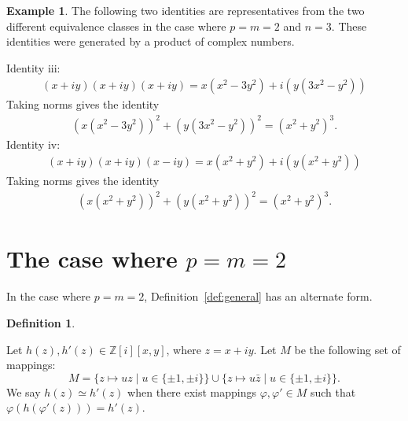 \documentclass[12pt]{article}
\theoremstyle{definition}
\newtheorem{definition}[theorem]{Definition}
\newtheorem{example}[theorem]{Example}
\theoremstyle{remark}
\newcommand{\Zzz}{\mathbb Z}
\numberwithin{equation}{section}
\begin{document}
\begin{example}
The following two identities are representatives from 
the two different equivalence classes in the
case where \( p = m = 2 \) and \( n = 3\).
These identities
were generated by a product of complex numbers. 

\noindent
Identity iii:
\begin{align*}
    (x + iy)(x + iy)(x + iy) 
    = x(x^2 - 3y^2) + i(  y(3x^2 - y^2) )  
    \end{align*}
Taking norms gives the identity
    \begin{align}
    (x(x^2 - 3y^2))^2 + (  y(3x^2 - y^2) )^2  
    = (x^2 + y^2)^3.
    \end{align}
Identity iv:
    \begin{align*}
    (x + iy )(x + iy)(x - iy ) 
    = x(x^2 + y^2 ) + i(y(x^2 + y^2))  
    \end{align*}
Taking norms gives the identity
    \begin{align}
    ( x(x^2 + y^2) )^2 + ( y(x^2 + y^2) )^2 
    = (x^2 + y^2 )^3.
    \end{align}
\end{example}







\section{The case where \( p = m = 2\)}


In the case where \( p = m = 2\), Definition~\ref{def:general} has an alternate form.



\begin{definition}
\label{def:2D}

Let \( h(z), h'(z) \in \Zzz [i][x,y] \),
where \( z = x + iy \).
Let \( M \) be the following set of mappings: 
\[
M = \{ z \mapsto uz \mid u \in \{ \pm 1, \pm i \} \}  
\cup \{ z\mapsto u \bar{z} \mid u \in \{ \pm 1, \pm i \} \}.  
\]
We say \( h(z) \simeq h'(z) \) when there exist mappings \( \varphi, \varphi' \in M \)
such that \( \varphi( h( \varphi'( z ) ) )  = h'(z) \).


\end{definition}
\end{document}
